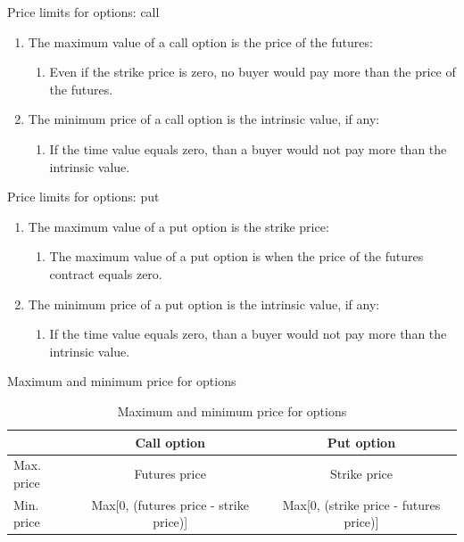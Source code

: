 \documentclass[table,xcolor=pdftex,dvipsnames]{beamer}\usepackage[]{graphicx}\usepackage[]{color}
\begin{document}
\begin{frame}{Price limits for options: call}
\begin{enumerate}[label=\textbullet]
  \item The maximum value of a call option is the price of the futures:
      \begin{enumerate}[label=-]
          \item Even if the strike price is zero, no buyer would pay more than the price of the futures.
       \end{enumerate}
  \item The minimum price of a call option is the intrinsic value, if any:
      \begin{enumerate}[label=-]
          \item If the time value equals zero, than a buyer would not pay more than the intrinsic value.
       \end{enumerate}
\end{enumerate}
\end{frame}

\begin{frame}{Price limits for options: put}
\begin{enumerate}[label=\textbullet]
  \item The maximum value of a put option is the strike price:
      \begin{enumerate}[label=-]
          \item The maximum value of a put option is when the price of the futures contract equals zero.
       \end{enumerate}
  \item The minimum price of a put option is the intrinsic value, if any:
      \begin{enumerate}[label=-]
          \item If the time value equals zero, than a buyer would not pay more than the intrinsic value.
       \end{enumerate}
\end{enumerate}
\end{frame}


\begin{frame}{Maximum and minimum price for options}
\begin{table}
\caption{Maximum and minimum price for options}
\scriptsize
\begin{tabular}{l c c }
  \toprule
    & Call option & Put option \\
  \midrule
  Max. price & Futures price & Strike price\\
  \addlinespace[0.075in]
  Min. price & Max[0, (futures price - strike price)] & Max[0, (strike price - futures price)]\\
  \bottomrule
\end{tabular}
\end{table}
\end{frame}
\end{document}
